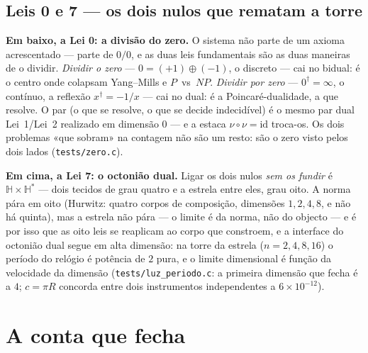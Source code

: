 \documentclass[11pt,a4paper]{article}
\newcommand{\code}[1]{\texttt{\small #1}}
\newcommand{\dg}{^{\dagger}}
\begin{document}
\subsection{Leis 0 e 7 --- os dois nulos que rematam a torre}\label{sub:zero}

\textbf{Em baixo, a Lei 0: a divisão do zero.} O sistema não parte de um axioma acrescentado ---
parte de $0/0$, e as duas leis fundamentais são as duas maneiras de o dividir. \emph{Dividir o zero}
--- $0=(+1)\oplus(-1)$, o discreto --- cai no bidual: é o centro onde colapsam Yang--Mills e
$P$~vs~$NP$. \emph{Dividir por zero} --- $0\dg=\infty$, o contínuo, a reflexão $x\dg=-1/x$ --- cai
no dual: é a Poincaré-dualidade, a que resolve. O par (o que se resolve, o que se decide indecidível)
é o mesmo par dual Lei~1/Lei~2 realizado em dimensão $0$ --- e a estaca $\nu\circ\nu=\mathrm{id}$
troca-os. Os dois problemas «que sobram» na contagem não são um resto: são o zero visto pelos dois
lados (\code{tests/zero.c}).

\textbf{Em cima, a Lei 7: o octonião dual.} Ligar os dois nulos \emph{sem os fundir} é
$\mathbb H\times\mathbb H^{*}$ --- dois tecidos de grau quatro e a estrela entre eles, grau oito. A
norma pára em oito (Hurwitz: quatro corpos de composição, dimensões $1,2,4,8$, e não há quinta), mas
a estrela não pára --- o limite é da norma, não do objecto --- e é por isso que as oito leis se
reaplicam ao corpo que constroem, e a interface do octonião dual segue em alta dimensão: na torre da
estrela ($n=2,4,8,16$) o período do relógio é potência de $2$ pura, e o limite dimensional é função
da velocidade da dimensão (\code{tests/luz\_periodo.c}: a primeira dimensão que fecha é a $4$;
$c=\pi R$ concorda entre dois instrumentos independentes a $6\times10^{-12}$).

\section{A conta que fecha}\label{sec:conta}
\end{document}
